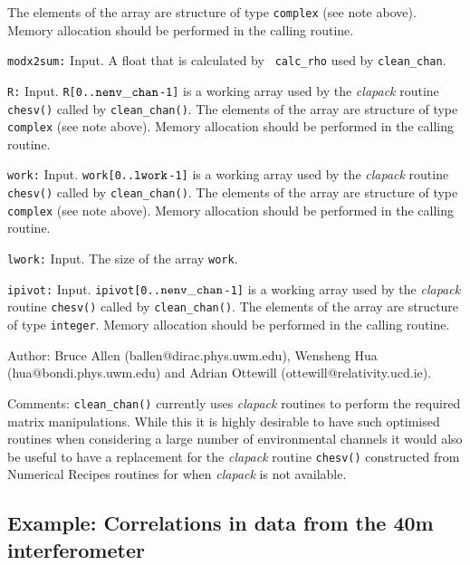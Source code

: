 \begin{description}
  The elements of the array are structure of type {\tt complex} (see
  note above).  Memory allocation should  be performed in the
  calling routine.
\item{\tt modx2sum:} Input.  A float that is calculated by {\tt
    calc\_rho} used by {\tt clean\_chan}.
\item{\tt R:} Input. {\tt R[0..${\tt nenv\_chan}$-1]} is a working
  array used by the {\sl clapack} routine {\tt chesv()} called by {\tt clean\_chan()}.  
  The elements of the array are structure of type {\tt complex} (see
  note above).  Memory allocation should be performed in the
  calling routine. 
\item{\tt work:} Input. {\tt work[0..${\tt lwork}$-1]} is a working
  array used by the {\sl clapack} routine {\tt chesv()} called by {\tt clean\_chan()}.  
  The elements of the array are structure of type {\tt complex} (see
  note above).  Memory allocation should be performed in the
  calling routine. 
\item{\tt lwork:} Input. The size of the array {\tt work}.
\item{\tt ipivot:} Input. {\tt ipivot[0..${\tt nenv\_chan}$-1]} is a working
  array used by the {\sl clapack} routine {\tt chesv()} called by {\tt clean\_chan()}.  
  The elements of the array are structure of type {\tt integer}.  Memory
  allocation should be performed in the  calling routine. 
\end{description}
\begin{description}
\item{Author:}
Bruce Allen (ballen@dirac.phys.uwm.edu), Wensheng Hua (hua@bondi.phys.uwm.edu)
  and Adrian Ottewill (ottewill@relativity.ucd.ie).
\item{Comments:}
{\tt clean\_chan()} currently uses {\sl clapack} routines to
perform the required matrix manipulations.  While this it is highly
desirable to have such optimised routines when considering a large
number of environmental channels it would also be useful to have a replacement
for the {\sl clapack} routine {\tt chesv()} constructed from Numerical
Recipes routines for when {\sl clapack} is not available.
\end{description}

\clearpage




\subsection{Example: Correlations in data from the  40m interferometer }


